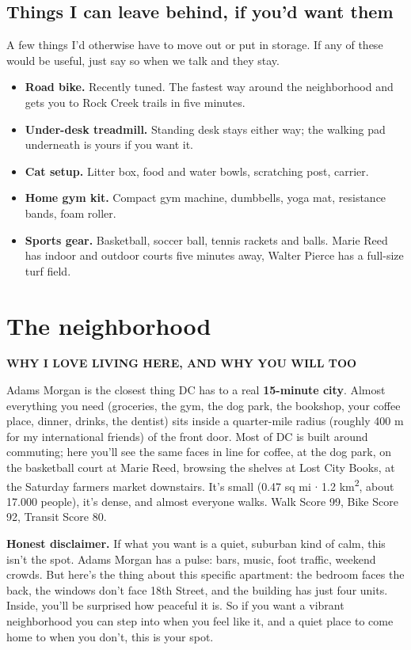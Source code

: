 \documentclass[11pt,a4paper]{article}
\newcommand{\eyebrow}[1]{{\sansheading\bfseries\footnotesize\color{brandred}\MakeUppercase{#1}\par\vspace{0.2em}}}
\begin{document}
\subsection*{Things I can leave behind, if you'd want them}

A few things I'd otherwise have to move out or put in storage. If any of these would be useful, just say so when we talk and they stay.

\begin{itemize}[leftmargin=1.2em]
\item \textbf{Road bike.} Recently tuned. The fastest way around the neighborhood and gets you to Rock Creek trails in five minutes.
\item \textbf{Under-desk treadmill.} Standing desk stays either way; the walking pad underneath is yours if you want it.
\item \textbf{Cat setup.} Litter box, food and water bowls, scratching post, carrier.
\item \textbf{Home gym kit.} Compact gym machine, dumbbells, yoga mat, resistance bands, foam roller.
\item \textbf{Sports gear.} Basketball, soccer ball, tennis rackets and balls. Marie Reed has indoor and outdoor courts five minutes away, Walter Pierce has a full-size turf field.
\end{itemize}

\clearpage

\section{The neighborhood}\label{sec:nbh}

\eyebrow{Why I love living here, and why you will too}

Adams Morgan is the closest thing DC has to a real \textbf{15-minute city}. Almost everything you need (groceries, the gym, the dog park, the bookshop, your coffee place, dinner, drinks, the dentist) sits inside a quarter-mile radius (roughly 400 m for my international friends) of the front door. Most of DC is built around commuting; here you'll see the same faces in line for coffee, at the dog park, on the basketball court at Marie Reed, browsing the shelves at Lost City Books, at the Saturday farmers market downstairs. It's small (0.47 sq mi $\cdot$ 1.2 km\textsuperscript{2}, about 17.000 people), it's dense, and almost everyone walks. Walk Score 99, Bike Score 92, Transit Score 80.

\begin{tcolorbox}[
  enhanced, colback={brandred!8}, colframe=brandred, boxrule=0pt,
  borderline west={3pt}{0pt}{brandred},
  arc=2pt, left=14pt, right=14pt, top=10pt, bottom=10pt,
]
\textbf{Honest disclaimer.} If what you want is a quiet, suburban kind of calm, this isn't the spot. Adams Morgan has a pulse: bars, music, foot traffic, weekend crowds. But here's the thing about this specific apartment: the bedroom faces the back, the windows don't face 18th Street, and the building has just four units. Inside, you'll be surprised how peaceful it is. So if you want a vibrant neighborhood you can step into when you feel like it, and a quiet place to come home to when you don't, this is your spot.
\end{tcolorbox}
\end{document}
